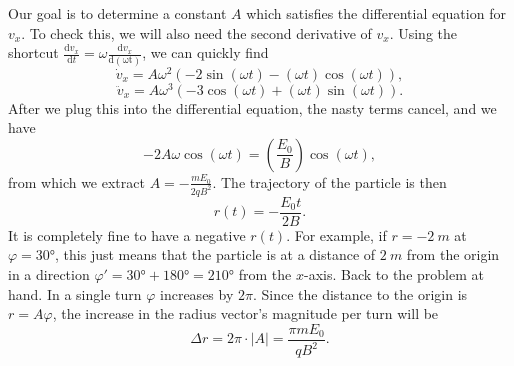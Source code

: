 \documentclass[../TST.tex]{subfiles}
\begin{document}
Our goal is to determine a constant $A$ which satisfies the differential equation for $v_x$. To check this, we will also need the second derivative of $v_x$. Using the shortcut $\frac{\mathrm{d}v_x}{\mathrm{d}t}=\omega \frac{\mathrm{d}v_x}{\mathrm{d(\omega t)}}$, we can quickly find
\begin{equation*}
	\dot{v}_x=A\omega^2\left(-2\sin{(\omega t)}-(\omega t)\cos{(\omega t)}\right) 
,
\end{equation*}
\begin{equation*}
	\ddot{v}_x=A\omega^3\left(-3\cos{(\omega t)}+(\omega t)\sin{(\omega t)}\right) 
.
\end{equation*}
After we plug this into the differential equation, the nasty terms cancel, and we have
\begin{equation*}
	-2A\omega\cos{(\omega t)}=\left(\frac{E_0}{B}\right) \cos{(\omega t)}
,
\end{equation*}
from which we extract $A=-\frac{mE_0}{2qB^2}$. The trajectory of the particle is then 
\begin{equation*}
r(t)=-\frac{E_0 t}{2B}
.
\end{equation*}
It is completely fine to have a negative $r(t)$. For example, if $r=\qty{-2}{m}$ at $\varphi=\ang{30}$, this just means that the particle is at a distance of $\qty{2}{m}$ from the origin in a direction $\varphi'=\ang{30}+\ang{180}=\ang{210}$ from the $x$-axis. Back to the problem at hand. In a single turn $\varphi$ increases by $2\pi$. Since the distance to the origin is $r=A\varphi$, the increase in the radius vector's magnitude per turn will be
\begin{equation*}
	\Delta r = 2\pi\cdot\left|A\right|= \boxed{\frac{\pi m E_0}{qB^2}.}
\end{equation*}

\fi
\end{document}
